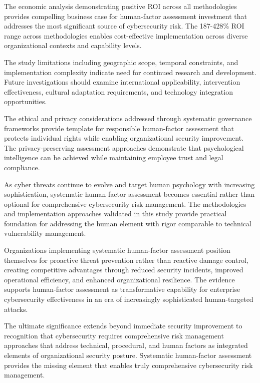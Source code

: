 \documentclass[10pt, twocolumn]{article}
\begin{document}
The economic analysis demonstrating positive ROI across all methodologies provides compelling business case for human-factor assessment investment that addresses the most significant source of cybersecurity risk. The 187-428\% ROI range across methodologies enables cost-effective implementation across diverse organizational contexts and capability levels.

The study limitations including geographic scope, temporal constraints, and implementation complexity indicate need for continued research and development. Future investigations should examine international applicability, intervention effectiveness, cultural adaptation requirements, and technology integration opportunities.

The ethical and privacy considerations addressed through systematic governance frameworks provide template for responsible human-factor assessment that protects individual rights while enabling organizational security improvement. The privacy-preserving assessment approaches demonstrate that psychological intelligence can be achieved while maintaining employee trust and legal compliance.

As cyber threats continue to evolve and target human psychology with increasing sophistication, systematic human-factor assessment becomes essential rather than optional for comprehensive cybersecurity risk management. The methodologies and implementation approaches validated in this study provide practical foundation for addressing the human element with rigor comparable to technical vulnerability management.

Organizations implementing systematic human-factor assessment position themselves for proactive threat prevention rather than reactive damage control, creating competitive advantages through reduced security incidents, improved operational efficiency, and enhanced organizational resilience. The evidence supports human-factor assessment as transformative capability for enterprise cybersecurity effectiveness in an era of increasingly sophisticated human-targeted attacks.

The ultimate significance extends beyond immediate security improvement to recognition that cybersecurity requires comprehensive risk management approaches that address technical, procedural, and human factors as integrated elements of organizational security posture. Systematic human-factor assessment provides the missing element that enables truly comprehensive cybersecurity risk management.
\end{document}
